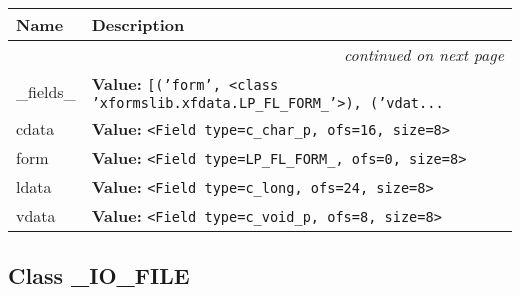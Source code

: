     \vspace{-1cm}
\hspace{\varindent}\begin{longtable}{|p{\varnamewidth}|p{\vardescrwidth}|l}
\cline{1-2}
\cline{1-2} \centering \textbf{Name} & \centering \textbf{Description}& \\
\cline{1-2}
\endhead\cline{1-2}\multicolumn{3}{r}{\small\textit{continued on next page}}\\\endfoot\cline{1-2}
\endlastfoot\raggedright \_\-f\-i\-e\-l\-d\-s\-\_\- & \raggedright \textbf{Value:} 
{\tt \texttt{[}\texttt{(}\texttt{'}\texttt{form}\texttt{'}\texttt{, }{\textless}class 'xformslib.xfdata.LP\_FL\_FORM\_'{\textgreater}\texttt{)}\texttt{, }\texttt{(}\texttt{'}\texttt{vdat}\texttt{...}}&\\
\cline{1-2}
\raggedright c\-d\-a\-t\-a\- & \raggedright \textbf{Value:} 
{\tt {\textless}Field type=c\_char\_p, ofs=16, size=8{\textgreater}}&\\
\cline{1-2}
\raggedright f\-o\-r\-m\- & \raggedright \textbf{Value:} 
{\tt {\textless}Field type=LP\_FL\_FORM\_, ofs=0, size=8{\textgreater}}&\\
\cline{1-2}
\raggedright l\-d\-a\-t\-a\- & \raggedright \textbf{Value:} 
{\tt {\textless}Field type=c\_long, ofs=24, size=8{\textgreater}}&\\
\cline{1-2}
\raggedright v\-d\-a\-t\-a\- & \raggedright \textbf{Value:} 
{\tt {\textless}Field type=c\_void\_p, ofs=8, size=8{\textgreater}}&\\
\cline{1-2}
\end{longtable}



\subsection{Class \_IO\_FILE}

